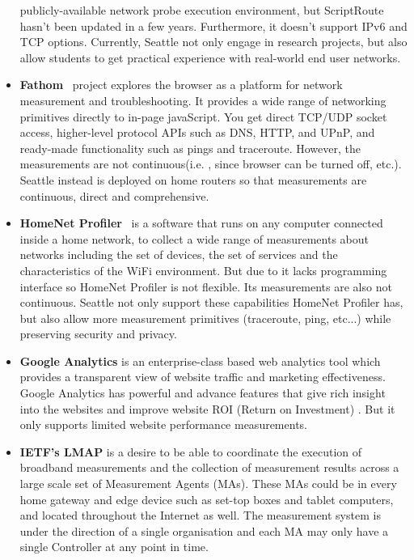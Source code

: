 \begin{itemize}
publicly-available network probe execution environment, but ScriptRoute 
hasn't been updated in a few years. Furthermore, it doesn't support IPv6 and 
TCP options. Currently, Seattle not only engage in research projects, but 
also  allow students to get practical experience with real-world end user 
networks.
\item \textbf{Fathom}~\cite{dhawan2012fathom} project explores the browser 
as a platform for network measurement and troubleshooting. It provides a 
wide range of networking primitives directly to in-page javaScript. You get 
direct TCP/UDP socket access, higher-level protocol APIs such as DNS, HTTP, 
and UPnP, and ready-made functionality such as pings and traceroute. 
However, the measurements are not continuous(i.e. , since browser can be 
turned off, etc.). Seattle instead is deployed on home routers so that 
measurements are continuous, direct and comprehensive.
\item \textbf{HomeNet Profiler}~\cite{dicioccio2013measuring} is a software 
that runs on any computer connected inside a home network, to collect a wide 
range of measurements about networks including the set of devices, the set 
of services and the characteristics of the WiFi environment. But due to it 
lacks programming interface so HomeNet Profiler is not flexible. Its 
measurements are also not continuous. Seattle not only support these 
capabilities HomeNet Profiler has, but also allow more measurement primitives
(traceroute, ping, etc...) while preserving security and privacy.
\item \textbf{Google Analytics} is an enterprise-class based web analytics 
tool which provides a transparent view of website traffic and marketing 
effectiveness. Google Analytics has powerful and advance features that give 
rich insight into the websites and improve website ROI (Return on Investment)
. But it only supports limited website performance measurements.
\item \textbf{IETF's LMAP} is a desire to be able to coordinate the 
execution of broadband measurements and the collection of measurement 
results across a large scale set of Measurement Agents (MAs). These MAs 
could be in every home gateway and edge device such as set-top boxes and 
tablet computers, and located throughout the Internet as well. The 
measurement system is under the direction of a single organisation and each 
MA may only have a single Controller at any point in time.
\end{itemize}

